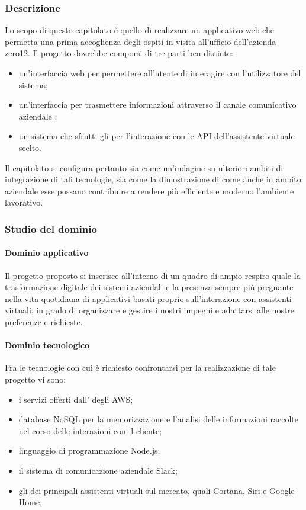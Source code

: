 		\subsubsection{Descrizione}
		Lo scopo di questo capitolato è quello di realizzare un applicativo web che permetta una prima accoglienza degli ospiti in visita all'ufficio 
		dell'azienda zero12. Il progetto dovrebbe comporsi di tre parti ben distinte: 
		\begin{itemize}
			\item un'interfaccia web per permettere all'utente di interagire con l'utilizzatore del sistema;
			\item un'interfaccia per trasmettere informazioni attraverso il canale comunicativo aziendale ;
			\item un sistema che sfrutti gli  per l'interazione con le API dell'assistente virtuale scelto.
		\end{itemize}
		Il capitolato si configura pertanto sia come un'indagine su ulteriori ambiti di integrazione di tali tecnologie, sia come la dimostrazione 
		di come anche in ambito aziendale esse possano contribuire a rendere più efficiente e moderno l'ambiente lavorativo.
		\subsubsection{Studio del dominio}
			\paragraph{Dominio applicativo}
			Il progetto proposto si inserisce all'interno di un quadro di ampio respiro quale la trasformazione digitale dei sistemi aziendali e la 
			presenza sempre più pregnante nella vita quotidiana di applicativi basati proprio sull'interazione con assistenti virtuali, in grado di 
			organizzare e gestire i nostri impegni e adattarsi alle nostre preferenze e richieste.
			
			\paragraph{Dominio tecnologico}
			Fra le tecnologie con cui è richiesto confrontarsi per la realizzazione di tale progetto vi sono:
			\begin{itemize}
				\item i servizi offerti dall' degli AWS;
				\item database NoSQL per la memorizzazione e l'analisi delle informazioni raccolte nel corso delle interazioni con il cliente;
				\item linguaggio di programmazione Node.js;
				\item il sistema di comunicazione aziendale Slack;
				\item gli  dei principali assistenti virtuali sul mercato, quali Cortana, Siri e Google Home.
			\end{itemize}
